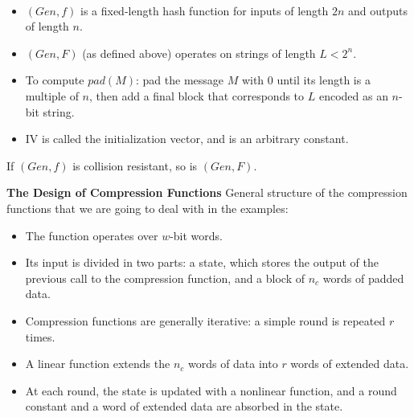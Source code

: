 \begin{definition}\ 
    \begin{itemize}
        \item $(Gen,f)$ is a fixed-length hash function for inputs of length $2n$ and outputs of length $n$.
        \item $(Gen,F)$ (as defined above) operates on strings of length $L < 2^n$.
        \item To compute $pad(M)$: pad the message $M$ with 0 until its length is a multiple of $n$, then add a final block that corresponds to $L$ encoded as an $n$-bit string.
        \item IV is called the initialization vector, and is an arbitrary constant.\newline
    \end{itemize}
\end{definition}


\begin{theorem}
    If $(Gen,f)$ is collision resistant, so is $(Gen,F)$.\newline
\end{theorem}


\textbf{The Design of Compression Functions}\newline
General structure of the compression functions that we are going to deal with in the examples:
\begin{itemize}
    \item The function operates over $w$-bit words.
    \item Its input is divided in two parts: a state, which stores the output of the previous call to the compression function, and a block of $n_c$ words of padded data.
    \item Compression functions are generally iterative: a simple round is repeated $r$ times.
    \item A linear function extends the $n_c$ words of data into $r$ words of extended data.
    \item At each round, the state is updated with a nonlinear function, and a round constant and a word of extended data are absorbed in the state.\newline
\end{itemize}


